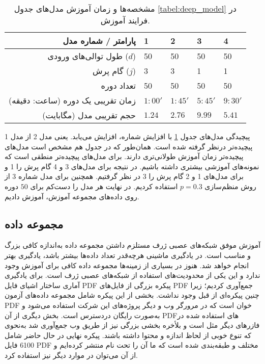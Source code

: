 \begin{table}%
	\caption{
		مشخصه‌ها و زمان آموزش مدل‌های جدول \ref{tabel:deep_model} در فرایند آموزش.}
	\label{tabel:model_parameters}
	\centering
	\onehalfspacing
	\begin{tabularx}{0.95\linewidth}{r p{15mm} p{15mm} p{15mm} p{15mm}}
		
		\toprule[1.5pt]  پارامتر / شماره مدل & 1 & 2 & 3 &  4
		\\
		\midrule[1.5pt] طول توالی‌های ورودی ($d$) & 50 & 50 &  50 & 50 
		\\
		 گام پرش ($j$) & 3 & 3 &  1 & 1 
		\\
		 تعداد دوره & 50 & 50 &  50 & 50 
		\\
		 زمان تقریبی یک دوره (ساعت: دقیقه) &   $  1:00'$  &   $1:45'$  &  $5:45'$&           $  9:30'$ 
		\\
		 حجم تقریبی مدل (مگابایت) & $ 1.24$ & $ 2.76$ &  $ 9.99$ & $ 5.41$ 
		\\
		\bottomrule[1.5pt]
		
	\end{tabularx} 
\end{table}
 
 پیچیدگی مدل‌های جدول \ref{tabel:model_parameters} با افزایش شماره، افزایش می‌یابد. یعنی مدل 2 از مدل 1 پیچیده‌تر درنظر گرفته شده است. همان‌طور که در جدول هم مشخص است مدل‌های پیچیده‌تر زمان آموزش طولانی‌تری دارند. برای مدل‌های پیچیده‌تر منطقی است که نمونه‌های آموزشی بیشتری داشته باشیم. در نتیجه برای مدل‌های 3 و 4 گام پرش را 1 و برای مدل‌های 1 و 2 گام پرش را 3 در نظر گرفتیم. همچنین برای مدل شماره 3 از روش منظم‌سازی
  \cite{JMLR:v15:srivastava14a}
   $p=0.3$ 
  استفاده کردیم. در نهایت هر مدل را دست‌کم برای $50$ دوره روی داده‌های مجموعه آموزش، آموزش دادیم.
 
 \subsection{مجموعه داده}
 آموزش موفق شبکه‌های عصبی ژرف مستلزم داشتن مجموعه داده به‌اندازه کافی بزرگ و مناسب است. در یادگیری ماشینی هرچه‌قدر تعداد داده‌ها بیشتر باشد، یادگیری بهتر انجام خواهد شد. هنوز در بسیاری از زمینه‌ها مجموعه داده کافی برای آموزش وجود ندارد و این یکی از محدودیت‌های استفاده از شبکه‌های عصبی ژرف است. برای یادگیری آماری ساختار اشیای فایل \gls{PDF} پیکره بزرگی از فایل‌های \gls{PDF} جمع‌آوری کردیم؛ زیرا چنین پیکره‌ای از قبل وجود نداشت. بخشی از این پیکره شامل مجموعه داده‌های آزمون \gls{PDF} خوان
   است که در مرورگر وب
     و دیگر پروژه‌های این شرکت استفاده می‌شود و به‌صورت رایگان دردسترس است. بخش دیگری از آن \gls{PDF}های استفاده شده در فازرهای دیگر مثل
       است و بلأخره بخشی بزرگی نیز از طریق وب جمع‌آوری شد به‌نحوی که تنوع خوبی از لحاظ اندازه و محتوا داشته باشند. پیکره نهایی در حال حاضر شامل 6100 فایل \gls{PDF} مختلف و طبقه‌بندی شده است که ما آن را تحت نام 
       منتشر کرده‌ایم و از آن می‌توان در موارد دیگر نیز استفاده کرد.
 
